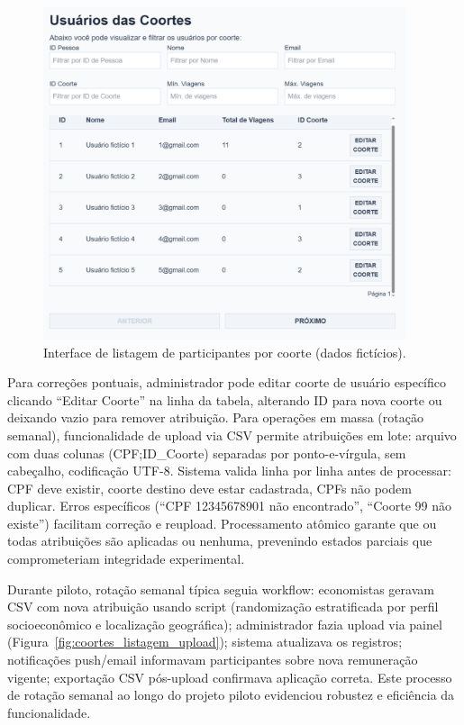  \begin{figure}[htb]
    \centering
    \includegraphics[width=0.95\textwidth]{figuras/usuario_coortes_zoom.PNG}
    \caption{Interface de listagem de participantes por coorte (dados fictícios).}
    \label{fig:coortes_listagem_usuarios}
  \end{figure}

Para correções pontuais, administrador pode editar coorte de usuário específico clicando ``Editar Coorte'' na linha da tabela, alterando ID para nova coorte ou deixando vazio para remover atribuição. Para operações em massa (rotação semanal), funcionalidade de upload via CSV permite atribuições em lote: arquivo com duas colunas (CPF;ID\_Coorte) separadas por ponto-e-vírgula, sem cabeçalho, codificação UTF-8. Sistema valida linha por linha antes de processar: CPF deve existir, coorte destino deve estar cadastrada, CPFs não podem duplicar. Erros específicos (``CPF 12345678901 não encontrado'', ``Coorte 99 não existe'') facilitam correção e reupload. Processamento atômico garante que ou todas atribuições são aplicadas ou nenhuma, prevenindo estados parciais que comprometeriam integridade experimental.

Durante piloto, rotação semanal típica seguia workflow: economistas geravam CSV com nova atribuição usando script (randomização estratificada por perfil socioeconômico e localização geográfica); administrador fazia upload via painel (Figura~\ref{fig:coortes_listagem_upload}); sistema atualizava os registros; notificações push/email informavam participantes sobre nova remuneração vigente; exportação CSV pós-upload confirmava aplicação correta. Este processo de rotação semanal ao longo do projeto piloto evidenciou robustez e eficiência da funcionalidade.

